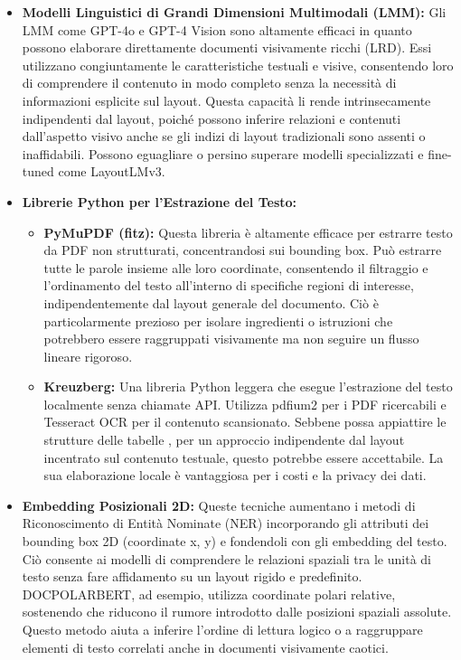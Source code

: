 \documentclass[a4paper, 11pt]{article}
\begin{document}
\begin{itemize}
    \item \textbf{Modelli Linguistici di Grandi Dimensioni Multimodali (LMM):} Gli LMM come GPT-4o e GPT-4 Vision sono altamente efficaci in quanto possono elaborare direttamente documenti visivamente ricchi (LRD). \cite{amazon_science_heterogenous} Essi utilizzano congiuntamente le caratteristiche testuali e visive, consentendo loro di comprendere il contenuto in modo completo senza la necessità di informazioni esplicite sul layout. \cite{problem_solved_layout_extraction} Questa capacità li rende intrinsecamente indipendenti dal layout, poiché possono inferire relazioni e contenuti dall'aspetto visivo anche se gli indizi di layout tradizionali sono assenti o inaffidabili. Possono eguagliare o persino superare modelli specializzati e fine-tuned come LayoutLMv3. \cite{problem_solved_layout_extraction}
    \item \textbf{Librerie Python per l'Estrazione del Testo:}
    \begin{itemize}
        \item \textbf{PyMuPDF (fitz):} Questa libreria è altamente efficace per estrarre testo da PDF non strutturati, concentrandosi sui bounding box. \cite{analytics_vidhya_pdf_extraction} Può estrarre tutte le parole insieme alle loro coordinate, consentendo il filtraggio e l'ordinamento del testo all'interno di specifiche regioni di interesse, indipendentemente dal layout generale del documento. \cite{analytics_vidhya_pdf_extraction} Ciò è particolarmente prezioso per isolare ingredienti o istruzioni che potrebbero essere raggruppati visivamente ma non seguire un flusso lineare rigoroso.
        \item \textbf{Kreuzberg:} Una libreria Python leggera che esegue l'estrazione del testo localmente senza chiamate API. \cite{medium_kreuzberg} Utilizza pdfium2 per i PDF ricercabili e Tesseract OCR per il contenuto scansionato. Sebbene possa appiattire le strutture delle tabelle \cite{medium_kreuzberg}, per un approccio indipendente dal layout incentrato sul contenuto testuale, questo potrebbe essere accettabile. La sua elaborazione locale è vantaggiosa per i costi e la privacy dei dati.
    \end{itemize}
    \item \textbf{Embedding Posizionali 2D:} Queste tecniche aumentano i metodi di Riconoscimento di Entità Nominate (NER) incorporando gli attributi dei bounding box 2D (coordinate x, y) e fondendoli con gli embedding del testo. \cite{problem_solved_layout_extraction} Ciò consente ai modelli di comprendere le relazioni spaziali tra le unità di testo senza fare affidamento su un layout rigido e predefinito. DOCPOLARBERT, ad esempio, utilizza coordinate polari relative, sostenendo che riducono il rumore introdotto dalle posizioni spaziali assolute. \cite{docpolarbert} Questo metodo aiuta a inferire l'ordine di lettura logico o a raggruppare elementi di testo correlati anche in documenti visivamente caotici.

\end{itemize}
\end{document}
